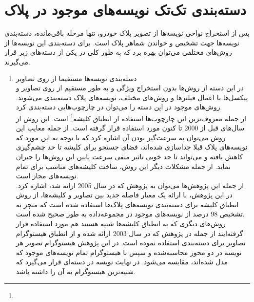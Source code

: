 \documentclass[12pt,a4paper]{article}
\newcommand{\enfootnote}[1]{\footnote{\lr{#1}}}
\begin{document}
\section{دسته‌بندی تک‌تک نویسه‌های موجود در پلاک}

پس از استخراج نواحی نویسه‌ها از تصویر پلاک خودرو، تنها مرحله باقی‌مانده، دسته‌بندی نویسه‌ها جهت تشخیص و خواندن شماهر پلاک است. برای دسته‌بندی این نویسه‌ها از روش‌های مختلفی می‌توان بهره برد که به طور کلی در یکی از دسته‌های زیر قرار می‌گیرند.

\begin{enumerate}
\item دسته‌بندی نویسه‌ها مستقیما از روی تصاویر \\
در این دسته‌ از روش‌ها بدون استخراج ویژگی و به طور مستقیم از روی تصاویر و پیکسل‌ها با اعمال فیلترها و روش‌های مختلف، نویسه‌های پلاک دسته‌بندی می‌شوند. روش‌های موجود در این دسته را می‌توان در چارچوب‌هایی دسته‌بندی کرد.
\\
از جمله معروف‌ترین این چارچوب‌ها استفاده از انطباق کلیشه‌\enfootnote{Template Matching} است. این روش از سال‌های قبل از 2000 تا کنون مورد استفاده قرار گرفته است. از جمله معایب این روش می‌توان به سرعت‌گیر بودن آن اشاره کرد که با توجه به این مورد که نویسه‌های پلاک قبلا جداسازی شده‌اند، فضای جستجو برای کلیشه تا حد چشم‌گیری کاهش یافته و می‌تواند تا حد خوبی تاثیر منفی سرعت پایین این روش‌ها را جبران نماید. از جمله مشکلات دیگر این روش، ساخت کلیشه‌های مناسب برای تمام نویسه‌های مجاز است. 
\\
از جمله این پژوهش‌ها می‌توان به پژوهش \cite{shuang2005number} که در سال 2005 ارائه شد، اشاره کرد. در این پژوهش، با ارائه یک معیار فاصله جدید بین تصاویر و کلیشه‌ها، از روش انطباق کلیشه برای دسته‌بندی نویسه‌های پلاک‌ها استفاده شده است که منچر به تشخیص 98 درصد از نویسه‌های موجود در مجموعه‌داده به طور صحیح  شده است. 
\\
روش‌های دیگری که به انطباق کلیشه‌ها شبیه هستند هم مورد استفاده قرار گرفته‌ایند از جمله در پژوهش \cite{rahman2003real} که در سال 2003 ارائه شده و از انطباق هیستوگرام تصاویر برای دسته‌بندی استفاده نموده است. در این پژوهش هیستوگرام تصویر هر نویسه در دو محور محاسبه‌شده و سپس با هیستوگرام تمام نویسه‌های موجود که مدل‌ شده‌اند، مقایسه می‌شود. در نهایت نویسه در دسته‌ای قرار می‌گیرد که شبیه‌ترین هیستوگرام به آن را داشته باشد.


\end{enumerate}
\end{document}
